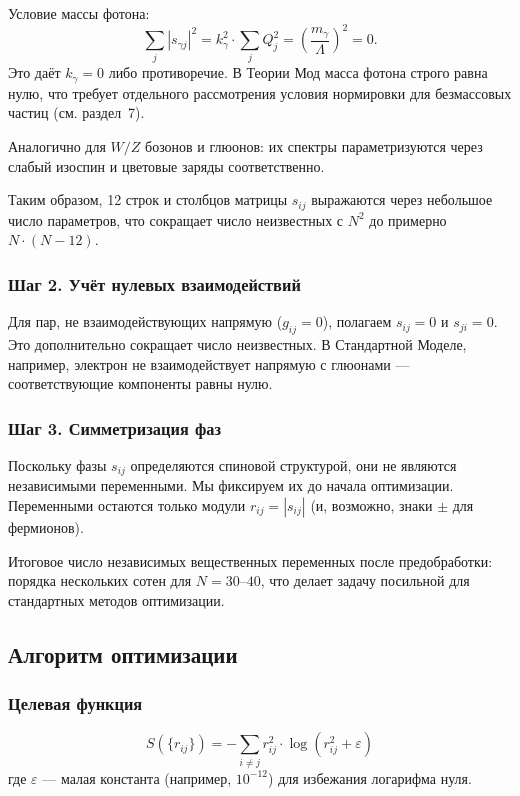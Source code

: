 \documentclass[12pt,a4paper]{article}
\begin{document}
Условие массы фотона:
\begin{equation}
    \sum_j |s_{\gamma j}|^2 = k_\gamma^2 \cdot \sum_j Q_j^2 = \left( \frac{m_\gamma}{\Lambda} \right)^2 = 0.
\end{equation}
Это даёт $k_\gamma = 0$ либо противоречие. В Теории Мод масса фотона строго равна нулю, что требует отдельного рассмотрения условия нормировки для безмассовых частиц (см. раздел~7).

Аналогично для $W/Z$ бозонов и глюонов: их спектры параметризуются через слабый изоспин и цветовые заряды соответственно.

Таким образом, 12 строк и столбцов матрицы $s_{ij}$ выражаются через небольшое число параметров, что сокращает число неизвестных с $N^2$ до примерно $N \cdot (N-12)$.

\subsubsection{Шаг 2. Учёт нулевых взаимодействий}
Для пар, не взаимодействующих напрямую ($g_{ij} = 0$), полагаем $s_{ij} = 0$ и $s_{ji} = 0$. Это дополнительно сокращает число неизвестных. В Стандартной Моделе, например, электрон не взаимодействует напрямую с глюонами --- соответствующие компоненты равны нулю.

\subsubsection{Шаг 3. Симметризация фаз}
Поскольку фазы $s_{ij}$ определяются спиновой структурой, они не являются независимыми переменными. Мы фиксируем их до начала оптимизации. Переменными остаются только модули $r_{ij} = |s_{ij}|$ (и, возможно, знаки $\pm$ для фермионов).

Итоговое число независимых вещественных переменных после предобработки: порядка нескольких сотен для $N = 30$--$40$, что делает задачу посильной для стандартных методов оптимизации.

\subsection{Алгоритм оптимизации}

\subsubsection{Целевая функция}
\begin{equation}
    S(\{r_{ij}\}) = -\sum_{i \neq j} r_{ij}^2 \cdot \log(r_{ij}^2 + \varepsilon)
\end{equation}
где $\varepsilon$ --- малая константа (например, $10^{-12}$) для избежания логарифма нуля.
\end{document}
